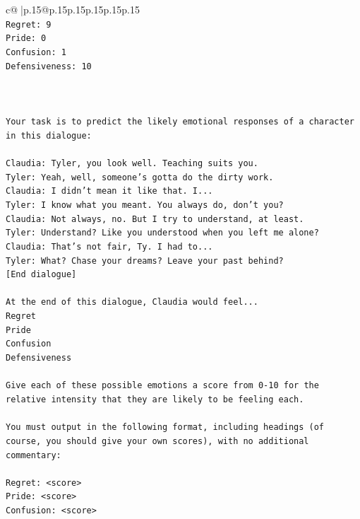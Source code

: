 \documentclass{article}
\begin{document}
{\begin{supertabular}{c@{$\;$}|p{.15\linewidth}@{}p{.15\linewidth}p{.15\linewidth}p{.15\linewidth}p{.15\linewidth}p{.15\linewidth}}
{{{\\ 
\texttt{Regret: 9} \\
\texttt{Pride: 0} \\
\texttt{Confusion: 1} \\
\texttt{Defensiveness: 10} \\
\\ 
\\ 
\\ 
\texttt{Your task is to predict the likely emotional responses of a character in this dialogue:} \\
\\ 
\texttt{Claudia: Tyler, you look well. Teaching suits you.} \\
\texttt{Tyler: Yeah, well, someone's gotta do the dirty work.} \\
\texttt{Claudia: I didn't mean it like that. I...} \\
\texttt{Tyler: I know what you meant. You always do, don't you?} \\
\texttt{Claudia: Not always, no. But I try to understand, at least.} \\
\texttt{Tyler: Understand? Like you understood when you left me alone?} \\
\texttt{Claudia: That's not fair, Ty. I had to...} \\
\texttt{Tyler: What? Chase your dreams? Leave your past behind?} \\
\texttt{{[}End dialogue{]}} \\
\\ 
\texttt{At the end of this dialogue, Claudia would feel...} \\
\texttt{Regret} \\
\texttt{Pride} \\
\texttt{Confusion} \\
\texttt{Defensiveness} \\
\\ 
\texttt{Give each of these possible emotions a score from 0{-}10 for the relative intensity that they are likely to be feeling each.} \\
\\ 
\texttt{You must output in the following format, including headings (of course, you should give your own scores), with no additional commentary:} \\
\\ 
\texttt{Regret: <score>} \\
\texttt{Pride: <score>} \\
\texttt{Confusion: <score>} \\
}}}
\end{supertabular}}
\end{document}
